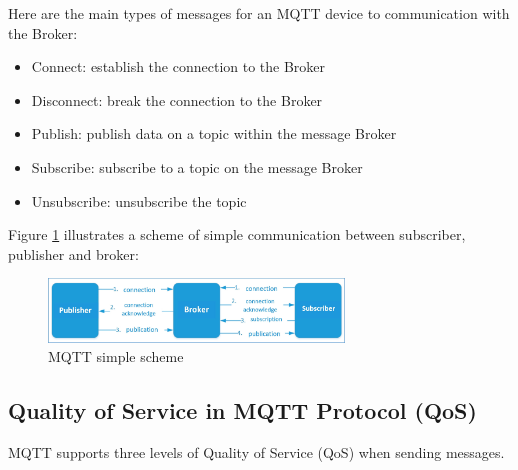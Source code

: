 \documentclass[\main/thesis.tex]{subfiles}
\begin{document}
Here are the main types of messages for an MQTT device to communication with the Broker:

\begin{itemize}
    \item Connect: establish the connection to the Broker
    \item Disconnect: break the connection to the Broker
    \item Publish: publish data on a topic within the message Broker
    \item Subscribe: subscribe to a topic on the message Broker
    \item Unsubscribe: unsubscribe the topic
\end{itemize}


Figure \ref{fig:mqtt_schema} illustrates a scheme of simple communication between subscriber, publisher and broker: 
\begin{figure}[H]
    \begin{center}
        \includegraphics[width=0.7\textwidth]{mqtt_schema.jpg}
    \end{center}
    \caption{MQTT simple scheme}
    \label{fig:mqtt_schema}
\end{figure}

\subsection{Quality of Service in MQTT Protocol (QoS)}

MQTT supports three levels of Quality of Service (QoS) when sending messages.
\end{document}
